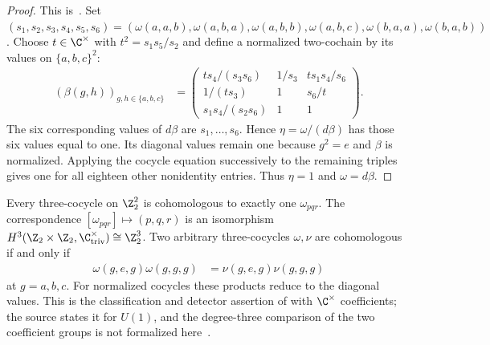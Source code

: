 \begin{proof}
    \leanok
    This is~\cite[``Triviality from the Klein diagonal
        signs'']{QICLean2026Blueprint}.
    Set $(s_1,s_2,s_3,s_4,s_5,s_6)=
        (\omega(a,a,b),\omega(a,b,a),\omega(a,b,b),\omega(a,b,c),
        \omega(b,a,a),\omega(b,a,b))$.
    Choose $t\in\C^\times$ with $t^2=s_1s_5/s_2$ and define a normalized
    two-cochain by its values on $\{a,b,c\}^2$:
    \begin{align}
        \label{eq:asymex_klein_trivial_gauge}
        (\beta(g,h))_{g,h\in\{a,b,c\}}
         & =\begin{pmatrix}
                ts_4/(s_3s_6)   & 1/s_3 & ts_1s_4/s_6 \\
                1/(ts_3)        & 1     & s_6/t       \\
                s_1s_4/(s_2s_6) & 1     & 1
            \end{pmatrix}.
    \end{align}
    The six corresponding values of $d\beta$ are $s_1,\ldots,s_6$.
    Hence $\eta=\omega/(d\beta)$ has those six values equal to one.
    Its diagonal values remain one because $g^2=e$ and $\beta$ is normalized.
    Applying the cocycle equation successively to the remaining triples
    gives one for all eighteen other nonidentity entries. Thus $\eta=1$
    and $\omega=d\beta$.
\end{proof}

\begin{lemma}
    \label{thm:asymex_klein_complete_classification}
    \leanok
    Every three-cocycle on $\Z_2^2$ is cohomologous to exactly one
    $\omega_{pqr}$. The correspondence $[\omega_{pqr}]\mapsto(p,q,r)$ is
    an isomorphism $H^3(\Z_2\times\Z_2,\C^\times_{\mathrm{triv}})\cong\Z_2^3$.
    Two arbitrary three-cocycles $\omega,\nu$ are cohomologous if and only if
    \begin{align}
        \label{eq:asymex_klein_complete_detectors}
        \omega(g,e,g)\omega(g,g,g) & =\nu(g,e,g)\nu(g,g,g)
    \end{align}
    at $g=a,b,c$. For normalized cocycles these products reduce to the
    diagonal values. This is the classification and detector assertion
    of \cite[Section~6]{GarreRubio2023MPOSym} with $\C^\times$ coefficients;
    the source states it for $U(1)$, and the degree-three comparison of the
    two coefficient groups is not formalized
    here~\cite{gap:glm23_klein_h3_circle_coefficients}.
\end{lemma}

